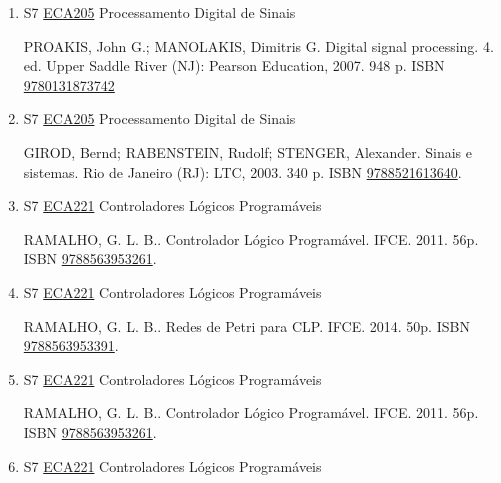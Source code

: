 \documentclass[12pt,a4paper]{book}
\begin{document}
\begin{enumerate}
 KUO, Sen M.  (Sen-Maw);  GAN, Woon-Seng.  Digital signal processors: architectures, implementations and applications.  Upper Saddle River (NJ): Pearson Prentice Hall, 2005.  601 p.   ISBN \href{http://www.isbnsearch.org/isbn/9780471295464}{9780471295464}
 
 
 \item S7 \hyperref[PUD:ECA205]{ECA205} Processamento Digital de Sinais

 PROAKIS, John G.;  MANOLAKIS, Dimitris G.  Digital signal processing.  4. ed.  Upper Saddle River (NJ): Pearson Education, 2007.  948 p.  ISBN \href{http://www.isbnsearch.org/isbn/9780131873742}{9780131873742} 
 
 
 \item S7 \hyperref[PUD:ECA205]{ECA205} Processamento Digital de Sinais

 GIROD, Bernd;  RABENSTEIN, Rudolf;  STENGER, Alexander.  Sinais e sistemas.  Rio de Janeiro (RJ): LTC, 2003.  340 p.  ISBN \href{http://www.bn.br/site/pages/servicosProfissionais/agenciaISBN/isbnBusca/FbnBuscaISBNCatalogo.asp?pField=ISBN&pIntPagina=1&pISBN=21613640&nidbISBN=true&hidbISBN=true}{9788521613640}.
 \item S7 \hyperref[PUD:ECA221]{ECA221} Controladores Lógicos Programáveis

 RAMALHO, G.  L. B..  Controlador Lógico Programável.  IFCE.  2011.  56p.  ISBN \href{http://www.bn.br/site/pages/servicosProfissionais/agenciaISBN/isbnBusca/FbnBuscaISBNCatalogo.asp?pField=ISBN&pIntPagina=1&pISBN=63953261&nidbISBN=true&hidbISBN=true}{9788563953261}. 
 
 
 \item S7 \hyperref[PUD:ECA221]{ECA221} Controladores Lógicos Programáveis

 RAMALHO, G.  L. B..  Redes de Petri para CLP.  IFCE.  2014.  50p.  ISBN \href{http://www.bn.br/site/pages/servicosProfissionais/agenciaISBN/isbnBusca/FbnBuscaISBNCatalogo.asp?pField=ISBN&pIntPagina=1&pISBN=63953391&nidbISBN=true&hidbISBN=true}{9788563953391}. 
 
 
 \item S7 \hyperref[PUD:ECA221]{ECA221} Controladores Lógicos Programáveis

 RAMALHO, G.  L. B..  Controlador Lógico Programável.  IFCE.  2011.  56p.  ISBN \href{http://www.bn.br/site/pages/servicosProfissionais/agenciaISBN/isbnBusca/FbnBuscaISBNCatalogo.asp?pField=ISBN&pIntPagina=1&pISBN=63953261&nidbISBN=true&hidbISBN=true}{9788563953261}. 
 
 
 \item S7 \hyperref[PUD:ECA221]{ECA221} Controladores Lógicos Programáveis


\end{enumerate}
\end{document}
